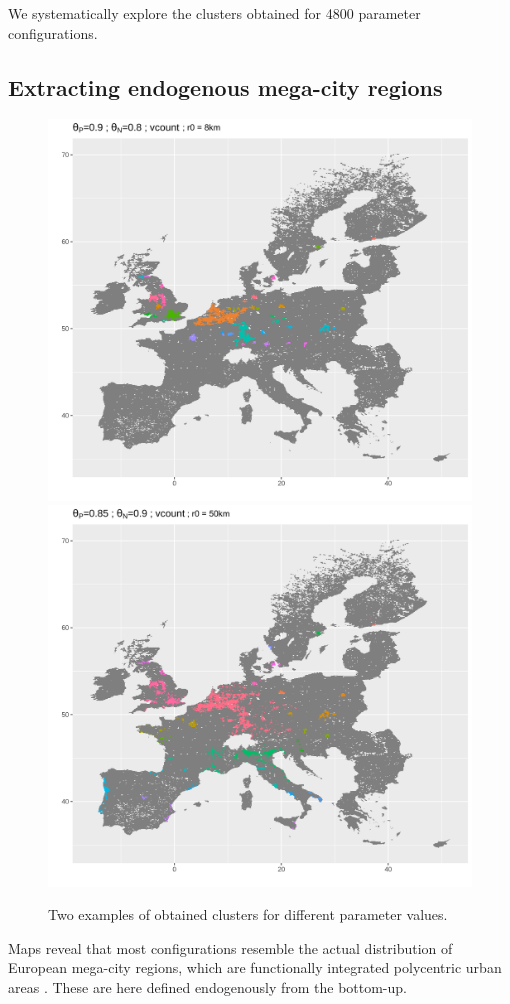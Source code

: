 \documentclass{jimis-en}
\begin{document}
We systematically explore the clusters obtained for 4800 parameter configurations.





\subsection{Extracting endogenous mega-city regions}


\begin{figure}[ht] 
  {\includegraphics[width=0.49\linewidth]{figures/totalPop2219780_36719597_vcount378_radius8000.png}}
  {\includegraphics[width=0.49\linewidth]{figures/totalPop1474347_36891685_vcount595_radius50000.png}}
  \centering
  \label{fig:exclusters}
  \caption{Two examples of obtained clusters for different parameter values.}
\end{figure}


Maps reveal that most configurations resemble the actual distribution of European mega-city regions, which are functionally integrated polycentric urban areas \citep{hall2006polycentric}. These are here defined endogenously from the bottom-up.

\end{document}
